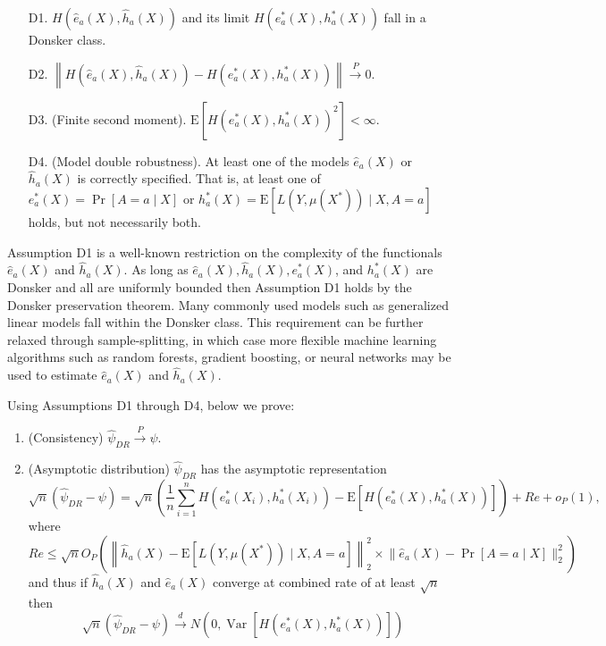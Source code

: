 \begin{enumerate}
    \item[D1.] $H(\widehat{e}_a(X), \widehat{h}_a(X))$ and its limit $H\left(e^*_a(X), h^*_a(X)\right)$ fall in a Donsker class.
    \item[D2.]  $\left\|H(\widehat{e}_a(X), \widehat{h}_a(X))-H\left(e^*_a(X), h^*_a(X)\right)\right\| \stackrel{P}{\longrightarrow} 0$.
    \item[D3.] (Finite second moment). $\mathrm{E}\left[H\left(e^*_a(X), h^*_a(X)\right)^2\right]<\infty$.
    \item[D4.] (Model double robustness). At least one of the models $\widehat{e}_a(X)$ or $\widehat{h}_a(X)$ is correctly specified. That is, at least one of $e^*_a(X)=\operatorname{Pr}[A=a \mid X]$ or $h^*_a(X)=\mathrm{E}\left[L\left(Y, \mu\left(X^*\right)\right) \mid X, A=a\right]$ holds, but not necessarily both.
\end{enumerate}

Assumption D1 is a well-known restriction on the complexity of the functionals $\widehat{e}_a(X)$ and $\widehat{h}_a(X)$. As long as $\widehat{e}_a(X), \widehat{h}_a(X), e^*_a(X)$, and $h^*_a(X)$ are Donsker and all are uniformly bounded then Assumption D1 holds by the Donsker preservation theorem. Many commonly used models such as generalized linear models fall within the Donsker class. This requirement can be further relaxed through sample-splitting, in which case more flexible machine learning algorithms such as random forests, gradient boosting, or neural networks may be used to estimate $\widehat{e}_a(X)$ and $\widehat{h}_a(X)$. 

Using Assumptions D1 through D4, below we prove:
\begin{enumerate}
    \item (Consistency) $\widehat{\psi}_{D R} \stackrel{P}{\longrightarrow} \psi$.
    \item (Asymptotic distribution) $\widehat{\psi}_{D R}$ has the asymptotic representation
    $$
    \sqrt{n}\left(\widehat{\psi}_{D R}-\psi\right)=\sqrt{n}\left(\frac{1}{n} \sum_{i=1}^n H\left(e^*_a(X_i), h^*_a(X_i)\right)-\mathrm{E}\left[H\left(e^*_a(X), h^*_a(X)\right)\right]\right)+R e+o_P(1),
    $$
    where
    $$
    R e \leq \sqrt{n} O_P\left(\left\|\widehat{h}_a(X)-\mathrm{E}\left[L\left(Y, \mu(X^*)\right) \mid X, A=a\right]\right\|_2^2 \times\Big\|\widehat{e}_a(X)-\operatorname{Pr}[A=a \mid X]\Big\|_2^2\right) 
    $$
    and thus if $\widehat{h}_a(X)$ and $\widehat{e}_a(X)$ converge at combined rate of at least $\sqrt{n}$ then
    $$
    \sqrt{n}\left(\widehat{\psi}_{D R}-\psi\right) \stackrel{d}{\longrightarrow} N\left(0, \operatorname{Var}\left[H(e^*_a(X), h^*_a(X))\right]\right)
    $$
\end{enumerate}

